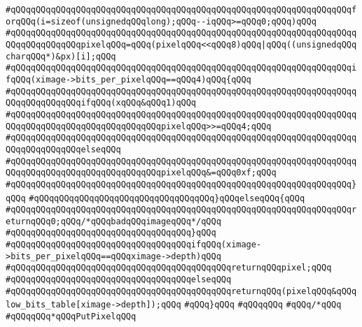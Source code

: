 \verb|#qQQqqQQqqQQqqQQqqQQqqQQqqQQqqQQqqQQqqQQqqQQqqQQqqQQqqQQqqQQqqQQqqQQqforqQQq(i=sizeof(unsignedqQQqlong);qQQq--iqQQq>=qQQq0;qQQq)qQQq|\newline
\verb|#qQQqqQQqqQQqqQQqqQQqqQQqqQQqqQQqqQQqqQQqqQQqqQQqqQQqqQQqqQQqqQQqqQQqqQQqqQQqqQQqqQQqpixelqQQq=qQQq(pixelqQQq<<qQQq8)qQQq|\verb#|qQQq((unsignedqQQqcharqQQq*)&px)[i];qQQq#\newline
\verb|#qQQqqQQqqQQqqQQqqQQqqQQqqQQqqQQqqQQqqQQqqQQqqQQqqQQqqQQqqQQqqQQqqQQqifqQQq(ximage->bits_per_pixelqQQq==qQQq4)qQQq{qQQq|\newline
\verb|#qQQqqQQqqQQqqQQqqQQqqQQqqQQqqQQqqQQqqQQqqQQqqQQqqQQqqQQqqQQqqQQqqQQqqQQqqQQqqQQqqQQqifqQQq(xqQQq&qQQq1)qQQq|\newline
\verb|#qQQqqQQqqQQqqQQqqQQqqQQqqQQqqQQqqQQqqQQqqQQqqQQqqQQqqQQqqQQqqQQqqQQqqQQqqQQqqQQqqQQqqQQqqQQqqQQqqQQqpixelqQQq>>=qQQq4;qQQq|\newline
\verb|#qQQqqQQqqQQqqQQqqQQqqQQqqQQqqQQqqQQqqQQqqQQqqQQqqQQqqQQqqQQqqQQqqQQqqQQqqQQqqQQqqQQqelseqQQq|\newline
\verb|#qQQqqQQqqQQqqQQqqQQqqQQqqQQqqQQqqQQqqQQqqQQqqQQqqQQqqQQqqQQqqQQqqQQqqQQqqQQqqQQqqQQqqQQqqQQqqQQqqQQqpixelqQQq&=qQQq0xf;qQQq|\newline
\verb|#qQQqqQQqqQQqqQQqqQQqqQQqqQQqqQQqqQQqqQQqqQQqqQQqqQQqqQQqqQQqqQQqqQQq}qQQq|\newline
\verb|#qQQqqQQqqQQqqQQqqQQqqQQqqQQqqQQqqQQq}qQQqelseqQQq{qQQq|\newline
\verb|#qQQqqQQqqQQqqQQqqQQqqQQqqQQqqQQqqQQqqQQqqQQqqQQqqQQqqQQqqQQqqQQqqQQqreturnqQQq0;qQQq/*qQQqbadqQQqimageqQQq*/qQQq|\newline
\verb|#qQQqqQQqqQQqqQQqqQQqqQQqqQQqqQQqqQQq}qQQq|\newline
\verb|#qQQqqQQqqQQqqQQqqQQqqQQqqQQqqQQqqQQqifqQQq(ximage->bits_per_pixelqQQq==qQQqximage->depth)qQQq|\newline
\verb|#qQQqqQQqqQQqqQQqqQQqqQQqqQQqqQQqqQQqqQQqqQQqreturnqQQqpixel;qQQq|\newline
\verb|#qQQqqQQqqQQqqQQqqQQqqQQqqQQqqQQqqQQqelseqQQq|\newline
\verb|#qQQqqQQqqQQqqQQqqQQqqQQqqQQqqQQqqQQqqQQqqQQqreturnqQQq(pixelqQQq&qQQqlow_bits_table[ximage->depth]);qQQq|\newline
\verb|#qQQq}qQQq|\newline
\verb|#qQQqqQQq|\newline
\newline
\verb|#qQQq/*qQQq|\newline
\verb|#qQQqqQQq*qQQqPutPixelqQQq|\newline
